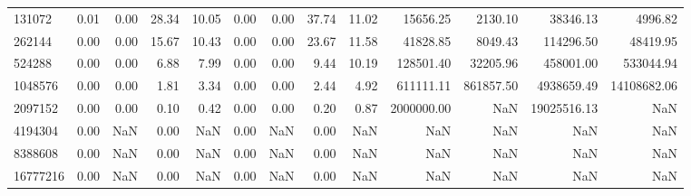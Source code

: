 \begin{tabular}{lrrrrrrrrrrrr}
131072 & 0.01 & 0.00 & 28.34 & 10.05 & 0.00 & 0.00 & 37.74 & 11.02 & 15656.25 & 2130.10 & 38346.13 & 4996.82 \\
262144 & 0.00 & 0.00 & 15.67 & 10.43 & 0.00 & 0.00 & 23.67 & 11.58 & 41828.85 & 8049.43 & 114296.50 & 48419.95 \\
524288 & 0.00 & 0.00 & 6.88 & 7.99 & 0.00 & 0.00 & 9.44 & 10.19 & 128501.40 & 32205.96 & 458001.00 & 533044.94 \\
1048576 & 0.00 & 0.00 & 1.81 & 3.34 & 0.00 & 0.00 & 2.44 & 4.92 & 611111.11 & 861857.50 & 4938659.49 & 14108682.06 \\
2097152 & 0.00 & 0.00 & 0.10 & 0.42 & 0.00 & 0.00 & 0.20 & 0.87 & 2000000.00 & NaN & 19025516.13 & NaN \\
4194304 & 0.00 & NaN & 0.00 & NaN & 0.00 & NaN & 0.00 & NaN & NaN & NaN & NaN & NaN \\
8388608 & 0.00 & NaN & 0.00 & NaN & 0.00 & NaN & 0.00 & NaN & NaN & NaN & NaN & NaN \\
16777216 & 0.00 & NaN & 0.00 & NaN & 0.00 & NaN & 0.00 & NaN & NaN & NaN & NaN & NaN \\
\bottomrule
\end{tabular}
